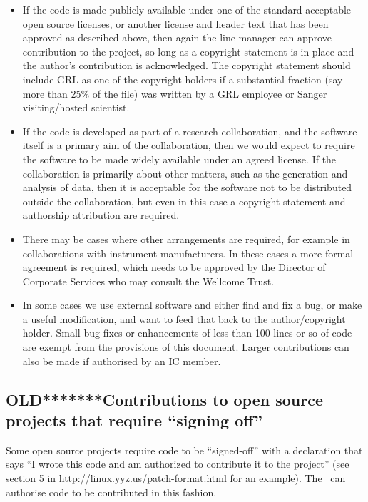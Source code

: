 \documentclass[10pt,a4paper]{article}
\begin{document}
\begin{itemize}
\item If the code is made publicly available under one of the standard acceptable open 
source licenses, or another license and header text that has been approved as 
described above, then again the line manager can approve contribution to the 
project, so long as a copyright statement is in place and the author's contribution 
is acknowledged. The copyright statement should include GRL as one of the 
copyright holders if a substantial fraction (say more than 25\% of the file) was 
written by a GRL employee or Sanger visiting/hosted scientist. 
\item If the code is developed as part of a research collaboration, and the software itself 
is a primary aim of the collaboration, then we would expect to require the 
software to be made widely available under an agreed license. If the 
collaboration is primarily about other matters, such as the generation and 
analysis of data, then it is acceptable for the software not to be distributed 
outside the collaboration, but even in this case a copyright statement and 
authorship attribution are required.
\item There may be cases where other arrangements are required, for example in 
collaborations with instrument manufacturers. In these cases a more formal 
agreement is required, which needs to be approved by the Director of Corporate 
Services who may consult the Wellcome Trust.
\item In some cases we use external software and either find and fix a bug, or make a 
useful modification, and want to feed that back to the author/copyright holder. 
Small bug fixes or enhancements of less than 100 lines or so of code are exempt 
from the provisions of this document. Larger contributions can also be made if 
authorised by an IC member. 
\end{itemize}


\subsection{OLD*******Contributions to open source projects that require ``signing off''}

Some open source projects require code to be ``signed-off'' with a declaration that says ``I 
wrote this code and am authorized to contribute it to the project'' (see section 5 in 
\url{http://linux.yyz.us/patch-format.html} for an example). The \exectitle\ can authorise 
code to be contributed in this fashion. 
\end{document}
